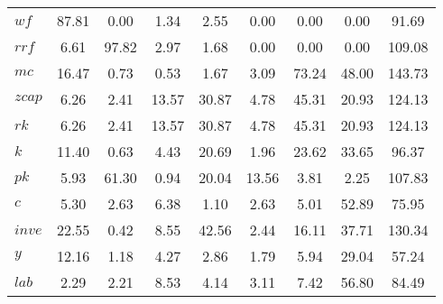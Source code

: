 \begin{center}
\begin{longtable}{lcccccccc}
$wf       $	 & 	               87.81	 & 	                0.00	 & 	                1.34	 & 	                2.55	 & 	                0.00	 & 	                0.00	 & 	                0.00	 & 	               91.69 \\ 
$rrf      $	 & 	                6.61	 & 	               97.82	 & 	                2.97	 & 	                1.68	 & 	                0.00	 & 	                0.00	 & 	                0.00	 & 	              109.08 \\ 
$mc       $	 & 	               16.47	 & 	                0.73	 & 	                0.53	 & 	                1.67	 & 	                3.09	 & 	               73.24	 & 	               48.00	 & 	              143.73 \\ 
$zcap     $	 & 	                6.26	 & 	                2.41	 & 	               13.57	 & 	               30.87	 & 	                4.78	 & 	               45.31	 & 	               20.93	 & 	              124.13 \\ 
$rk       $	 & 	                6.26	 & 	                2.41	 & 	               13.57	 & 	               30.87	 & 	                4.78	 & 	               45.31	 & 	               20.93	 & 	              124.13 \\ 
$k        $	 & 	               11.40	 & 	                0.63	 & 	                4.43	 & 	               20.69	 & 	                1.96	 & 	               23.62	 & 	               33.65	 & 	               96.37 \\ 
$pk       $	 & 	                5.93	 & 	               61.30	 & 	                0.94	 & 	               20.04	 & 	               13.56	 & 	                3.81	 & 	                2.25	 & 	              107.83 \\ 
$c        $	 & 	                5.30	 & 	                2.63	 & 	                6.38	 & 	                1.10	 & 	                2.63	 & 	                5.01	 & 	               52.89	 & 	               75.95 \\ 
$inve     $	 & 	               22.55	 & 	                0.42	 & 	                8.55	 & 	               42.56	 & 	                2.44	 & 	               16.11	 & 	               37.71	 & 	              130.34 \\ 
$y        $	 & 	               12.16	 & 	                1.18	 & 	                4.27	 & 	                2.86	 & 	                1.79	 & 	                5.94	 & 	               29.04	 & 	               57.24 \\ 
$lab      $	 & 	                2.29	 & 	                2.21	 & 	                8.53	 & 	                4.14	 & 	                3.11	 & 	                7.42	 & 	               56.80	 & 	               84.49 \\ 

\end{longtable}
\end{center}
